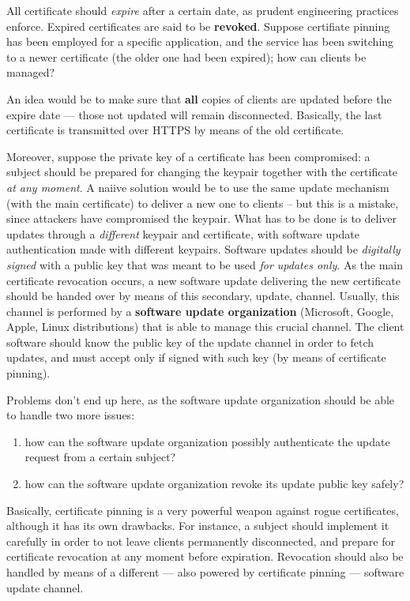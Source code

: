 \documentclass[10pt]{\classname}
\begin{document}
All certificate should \emph{expire} after a certain date, as prudent
engineering practices enforce. Expired certificates are said to be
\textbf{revoked}. Suppose certifiate pinning has been employed for
a specific application, and the service has been switching to a newer
certificate (the older one had been expired); how can clients be managed?

An idea would be to make sure that \textbf{all} copies of clients are updated
before the expire date --- those not updated will remain disconnected.
Basically, the last certificate is transmitted over HTTPS by means of the old
certificate.

Moreover, suppose the private key of a certificate has been compromised: a
subject should be prepared for changing the keypair together with the
certificate \emph{at any moment}. A naiive solution would be to use the same
update mechanism (with the main certificate) to deliver a new one to clients --
but this is a mistake, since attackers have compromised the keypair. What has
to be done is to deliver updates through a \emph{different} keypair and
certificate, with software update authentication made with different keypairs.
Software updates should be \emph{digitally signed} with a public key that was
meant to be used \emph{for updates only}. As the main certificate revocation
occurs, a new software update delivering the new certificate should be handed
over by means of this secondary, update, channel. Usually, this channel is
performed by a \textbf{software update organization} (Microsoft, Google, Apple,
Linux distributions) that is able to manage this crucial channel. The client
software should know the public key of the update channel in order to fetch
updates, and must accept only if signed with such key (by means of certificate
pinning).

Problems don't end up here, as the software update organization should be able
to handle two more issues:
\begin{enumerate}
    \item how can the software update organization possibly authenticate the update request
        from a certain subject?
    \item how can the software update organization revoke its update public key
        safely?
\end{enumerate}

Basically, certificate pinning is a very powerful weapon against rogue
certificates, although it has its own drawbacks. For instance, a subject should
implement it carefully in order to not leave clients permanently disconnected,
and prepare for certificate revocation at any moment before expiration.
Revocation should also be handled by means of a different --- also powered by
certificate pinning --- software update channel.
\end{document}
